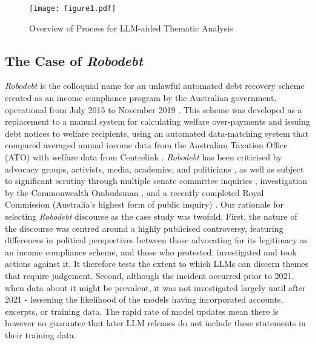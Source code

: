 \documentclass{article}
\begin{document}
\begin{figure}[ht]
\begin{center}
\centerline{\texttt{[image: figure1.pdf]}}   
\caption{Overview of Process for LLM-aided Thematic Analysis}
\label{figure1}
\end{center}
\vskip -0.4in
\end{figure}

\subsection{\texorpdfstring{The Case of \emph{Robodebt}}{The Case of Robodebt}}\label{the-case-of-robodebt}


\emph{Robodebt} is the colloquial name for an unlawful automated debt recovery scheme created as an income compliance program by the Australian government, operational from July 2015 to November 2019 \cite{servicesaustraliaInformationRobodebt2023}. This scheme was developed as a replacement to a manual system for calculating welfare over-payments and issuing debt notices to welfare recipients, using an automated data-matching system that compared averaged annual income data from the Australian Taxation Office (ATO) with welfare data from Centrelink \cite{servicesaustraliaInformationRobodebt2023}. \emph{Robodebt} has been criticised by advocacy groups, activists, media, academics, and politicians \cite{CrudeCruelRobodebt2023, ItNotJust, whitefordDebtDesignAnatomy2021}, as well as subject to significant scrutiny through multiple senate committee inquiries \cite{commonwealthAccountabilityJusticeWhy2022}, investigation by the Commonwealth Ombudsman \cite{commonwealthombudsmanAccountabilityActionIdentifying2023, commonwealthombudsmanCentrelinkAutomatedDebt2017}, and a recently completed Royal Commission (Australia's highest form of public inquiry) \cite{commonwealthRoyalCommissionRobodebt2023}. Our rationale for selecting \emph{Robodebt} discourse as the case study was twofold. First, the nature of the discourse was centred around a highly publicised controversy, featuring  differences in political perspectives between those advocating for its legitimacy as an income compliance scheme, and those who protested, investigated and took actions against it. It therefore tests the extent to which LLMs can discern themes that require judgement. Second, although the incident occurred prior to 2021, when data about it might be prevalent, it was not investigated largely until after 2021 - lessening the likelihood of the models having incorporated accounts, excerpts, or training data. The rapid rate of model updates mean there is however no guarantee that later LLM releases do not include these statements in their training data.
\end{document}
